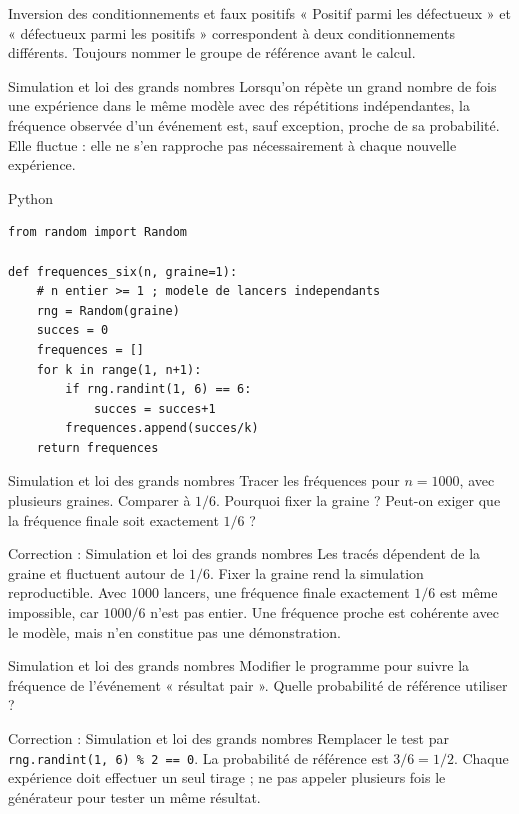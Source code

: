 \documentclass[aspectratio=169,10pt]{beamer}
\begin{document}
\begin{frame}{Inversion des conditionnements et faux positifs}
« Positif parmi les défectueux » et « défectueux parmi les positifs » correspondent à deux conditionnements différents. Toujours nommer le groupe de référence avant le calcul.
\end{frame}
\begin{frame}{Simulation et loi des grands nombres}
Lorsqu'on répète un grand nombre de fois une expérience dans le même modèle avec des répétitions indépendantes, la fréquence observée d'un événement est, sauf exception, proche de sa probabilité. Elle fluctue : elle ne s'en rapproche pas nécessairement à chaque nouvelle expérience.
\end{frame}
\begin{frame}[fragile]{Python}
\small
\begin{verbatim}
from random import Random

def frequences_six(n, graine=1):
    # n entier >= 1 ; modele de lancers independants
    rng = Random(graine)
    succes = 0
    frequences = []
    for k in range(1, n+1):
        if rng.randint(1, 6) == 6:
            succes = succes+1
        frequences.append(succes/k)
    return frequences
\end{verbatim}
\end{frame}
\begin{frame}{Simulation et loi des grands nombres}
Tracer les fréquences pour \(n=1000\), avec plusieurs graines. Comparer à \(1/6\). Pourquoi fixer la graine ? Peut-on exiger que la fréquence finale soit exactement \(1/6\) ?
\end{frame}
\begin{frame}{Correction : Simulation et loi des grands nombres}
Les tracés dépendent de la graine et fluctuent autour de \(1/6\). Fixer la graine rend la simulation reproductible. Avec \(1000\) lancers, une fréquence finale exactement \(1/6\) est même impossible, car \(1000/6\) n'est pas entier. Une fréquence proche est cohérente avec le modèle, mais n'en constitue pas une démonstration.
\end{frame}
\begin{frame}{Simulation et loi des grands nombres}
Modifier le programme pour suivre la fréquence de l'événement « résultat pair ». Quelle probabilité de référence utiliser ?
\end{frame}
\begin{frame}{Correction : Simulation et loi des grands nombres}
Remplacer le test par \texttt{rng.randint(1, 6) \% 2 == 0}. La probabilité de référence est \(3/6=1/2\). Chaque expérience doit effectuer un seul tirage ; ne pas appeler plusieurs fois le générateur pour tester un même résultat.
\end{frame}
\end{document}
